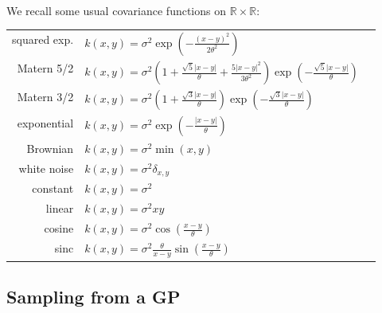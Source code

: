 \documentclass[11pt]{scrartcl}
\begin{document}
\paragraph{}
We recall some usual covariance functions on $\mathds{R} \times \mathds{R}$:\\
\begin{center}
\begin{tabular}{rlN}
		squared exp. & $\displaystyle k(x,y) = \sigma^2 \exp \left(- \frac{(x-y)^2}{2 \theta^2} \right)$ &\\[6mm]
		Matern 5/2 & $\displaystyle k(x,y) = \sigma^2 \left(1 + \frac{\sqrt{5}|x-y|}{\theta} + \frac{5|x-y|^2}{3 \theta^2} \right) \exp \left(- \frac{\sqrt{5}|x-y|}{\theta} \right)$ &\\[6mm]
		Matern 3/2 & $\displaystyle k(x,y) = \sigma^2 \left(1 + \frac{\sqrt{3}|x-y|}{\theta} \right) \exp \left(- \frac{\sqrt{3}|x-y|}{\theta} \right)$ &\\[6mm]
		exponential & $\displaystyle k(x,y) = \sigma^2 \exp \left(- \frac{|x-y|}{\theta} \right)$ &\\[6mm]
		Brownian & $ \displaystyle k(x,y) = \sigma^2 \min (x,y) $ &\\[6mm]
		white noise & $ \displaystyle k(x,y) = \sigma^2 \delta_{x,y} $ &\\[6mm]
		constant & $ \displaystyle k(x,y) = \sigma^2 $ &\\[6mm]
		linear & $ \displaystyle k(x,y) = \sigma^2 xy $ &\\[6mm]
		cosine & $ \displaystyle k(x,y) = \sigma^2 \cos \left (\frac{x-y}{\theta} \right) $ &\\[6mm]
		sinc & $ \displaystyle k(x,y) = \sigma^2 \frac{\theta}{x-y} \sin \left( \frac{x-y}{\theta} \right) $ &\\[6mm]
\end{tabular}
\end{center}

\subsection*{Sampling from a GP}
\end{document}
